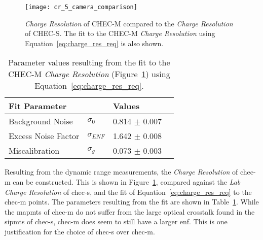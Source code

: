 \begin{figure}
	\centering
    \texttt{[image: cr\_5\_camera\_comparison]} 
	\caption[\textit{Charge Resolution} of CHEC-M.]{\textit{Charge Resolution} of CHEC-M compared to the \textit{Charge Resolution} of CHEC-S. The fit to the CHEC-M \textit{Charge Resolution} using Equation~\ref{eq:charge_res_req} is also shown.}
	\label{fig:cr_5_camera_comparison}
\end{figure}

\begin{table}[h!]
\centering
\begin{tabular}{ll|ll} \toprule
    Fit Parameter        &                & Values             \\ \midrule
    Background Noise     & $\sigma_0$     & 0.814 $\pm$ 0.007  \\
    Excess Noise Factor  & $\sigma_{ENF}$ & 1.642 $\pm$ 0.008  \\
    Miscalibration       & $\sigma_g$     & 0.073 $\pm$ 0.003  \\ \bottomrule
\end{tabular}
\caption{Parameter values resulting from the fit to the CHEC-M \textit{Charge Resolution} (Figure~\ref{fig:cr_5_camera_comparison}) using Equation~\ref{eq:charge_res_req}.}
\label{table:cr_5_camera_comparison}
\end{table}

Resulting from the dynamic range measurements, the \textit{Charge Resolution} of \gls{chec-m} can be constructed. This is shown in Figure~\ref{fig:cr_5_camera_comparison}, compared against the \textit{Lab Charge Resolution} of \gls{chec-s}, and the fit of Equation~\ref{eq:charge_res_req} to the \gls{chec-m} points. The parameters resulting from the fit are shown in Table~\ref{table:cr_5_camera_comparison}. While the \glspl{mapmt} of \gls{chec-m} do not suffer from the large optical crosstalk found in the \glspl{sipmt} of \gls{chec-s}, \gls{chec-m} does seem to still have a larger \gls{enf}. This is one justification for the choice of \gls{chec-s} over \gls{chec-m}.